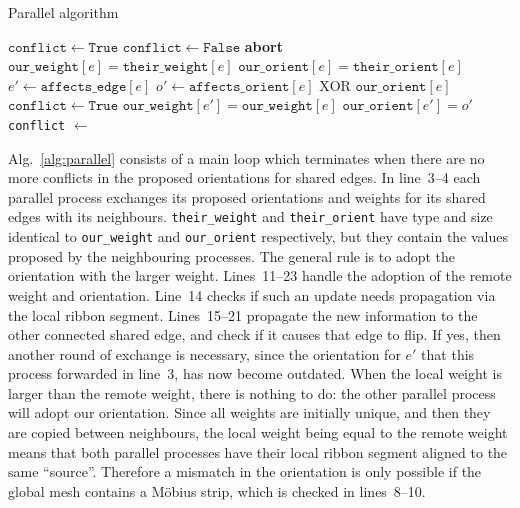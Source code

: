 \documentclass[oneeqnum,onethmnum,onefignum,onetabnum]{siamltex1213}
\begin{document}
\begin{algorithm}
  \caption{Parallel algorithm}
  \label{alg:parallel}
  \begin{algorithmic}[1]
    \State $ \mathtt{conflict} \gets \mathtt{True} $
      \State {}
      \State {}
      \State $ \mathtt{conflict} \gets \mathtt{False} $
            \State \textbf{abort}
          \EndIf
          \State $ \mathtt{our\_weight}[e] = \mathtt{their\_weight}[e] $
          \State $ \mathtt{our\_orient}[e] = \mathtt{their\_orient}[e] $
            \State $ e' \gets \mathtt{affects\_edge}[e] $
            \State $ o' \gets \mathtt{affects\_orient}[e] \text{ XOR } \mathtt{our\_orient}[e] $
              \State $ \mathtt{conflict} \gets \mathtt{True} $
            \EndIf
            \State $ \mathtt{our\_weight}[e'] = \mathtt{our\_weight}[e] $
            \State $ \mathtt{our\_orient}[e'] = o' $
          \EndIf
        \EndIf
      \EndFor
      \State \texttt{conflict} $ \gets $ 
    \EndWhile
  \end{algorithmic}
\end{algorithm}

Alg.~\ref{alg:parallel} consists of a main loop which terminates when there
are no more conflicts in the proposed orientations for shared edges. In
line~3--4 each parallel process exchanges its proposed orientations
and weights for its shared edges with its
neighbours. \texttt{their\_weight} and \texttt{their\_orient} have
type and size identical to \texttt{our\_weight} and
\texttt{our\_orient} respectively, but they contain the values
proposed by the
neighbouring processes. The general rule is to adopt the orientation with
the larger weight.  Lines~11--23 handle the adoption of the remote weight and
orientation. Line~14 checks if such an update needs propagation via the
local ribbon segment. Lines~15--21 propagate the new information to the
other connected shared edge, and check if it causes that edge to flip.
If yes, then
another round of exchange is necessary, since the orientation for $ e' $
that this process forwarded in line~3, has now become outdated. When the
local weight is larger than the remote weight, there is nothing to do: the
other parallel process will adopt our orientation.  Since all weights are
initially unique, and then they are copied between neighbours, the local
weight being equal to the remote weight means that both parallel processes
have their local ribbon segment aligned to the same ``source''. Therefore a
mismatch in the orientation is only possible if the global mesh contains a
Möbius strip, which is checked in lines~8--10.
\end{document}
